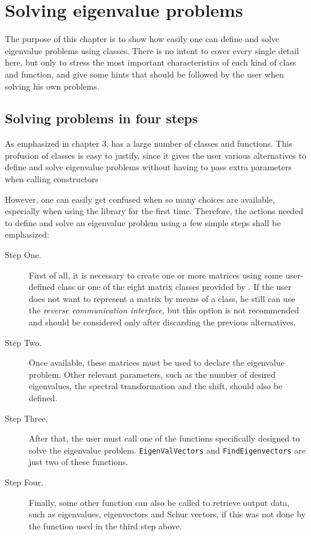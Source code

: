 \chapter{Solving eigenvalue problems}

The purpose of this chapter is to show how easily one can define and solve eigenvalue problems using \ARPP{} classes. There is no intent to cover every single \ARPP{} detail here, but only to stress the most important characteristics of each kind of class and function, and give some hints that should be followed by the user when solving his own problems.

\section{Solving problems in four steps}

As emphasized in chapter 3, \ARPP{} has a large number of classes and functions. This profusion of classes is easy to justify, since it gives the user various alternatives to define and solve eigenvalue problems without having to pass extra parameters when calling constructors

However, one can easily get confused when so many choices are available, especially when using the library for the first time. Therefore, the actions needed to define and solve an eigenvalue problem using a few simple steps shall be emphasized:

\begin{description}
	\item[Step One.] First of all, it is necessary to create one or more matrices using some user-defined class or one of the eight matrix classes provided by \ARPP{}. If the user does not want to represent a matrix by means of a class, he still can use the \textit{reverse communication interface}, but this option is not recommended and should be considered only after discarding the previous alternatives.
	\item[Step Two.] Once available, these matrices must be used to declare the eigenvalue problem. Other relevant parameters, such as the number of desired eigenvalues, the spectral transformation and the shift, should also be defined.
	\item[Step Three.] After that, the user must call one of the \ARPP{} functions specifically designed to solve the eigenvalue problem. \texttt{EigenValVectors} and \texttt{FindEigenvectors} are just two of these functions.
	\item[Step Four.] Finally, some other \ARPP{} function can also be called to retrieve output data, such as eigenvalues, eigenvectors and Schur vectors, if this was not done by the function used in the third step above.
\end{description}

